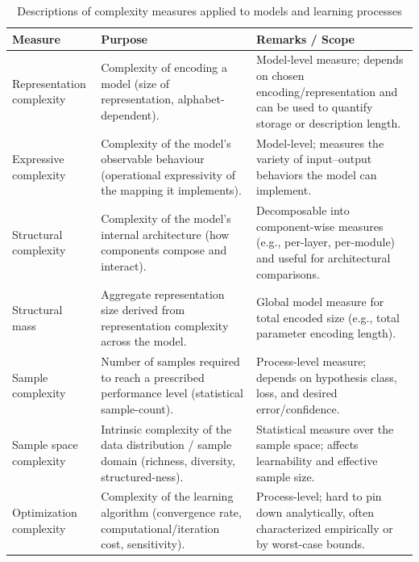 \documentclass[10pt]{article}
\begin{document}
\begin{table}[htbp]
  \centering
  \footnotesize
  \begin{threeparttable}
    \caption{Descriptions of complexity measures applied to models and learning processes}
    \label{tab:complexity-measures}
    \begin{tabularx}{\textwidth}{@{} >{\RaggedRight\arraybackslash}X
                                     >{\RaggedRight\arraybackslash}X
                                     >{\RaggedRight\arraybackslash}X @{}}
      \toprule
      \textbf{Measure} & \textbf{Purpose} & \textbf{Remarks / Scope} \\
      \midrule
      Representation complexity
        & Complexity of encoding a model (size of representation, alphabet-dependent).
        & Model-level measure; depends on chosen encoding/representation and can be used to quantify storage or description length. \\
      \addlinespace[2pt]
      Expressive complexity
        & Complexity of the model's observable behaviour (operational expressivity of the mapping it implements).
        & Model-level; measures the variety of input–output behaviors the model can implement. \\
      \addlinespace[2pt]
      Structural complexity
        & Complexity of the model's internal architecture (how components compose and interact).
        & Decomposable into component-wise measures (e.g., per-layer, per-module) and useful for architectural comparisons. \\
      \addlinespace[2pt]
      Structural mass
        & Aggregate representation size derived from representation complexity across the model.
        & Global model measure for total encoded size (e.g., total parameter encoding length). \\
      \addlinespace[2pt]
      Sample complexity
        & Number of samples required to reach a prescribed performance level (statistical sample-count).
        & Process-level measure; depends on hypothesis class, loss, and desired error/confidence. \\
      \addlinespace[2pt]
      Sample space complexity
        & Intrinsic complexity of the data distribution / sample domain (richness, diversity, structured-ness).
        & Statistical measure over the sample space; affects learnability and effective sample size. \\
      \addlinespace[2pt]
      Optimization complexity
        & Complexity of the learning algorithm (convergence rate, computational/iteration cost, sensitivity).
        & Process-level; hard to pin down analytically, often characterized empirically or by worst-case bounds. \\
      \bottomrule
    \end{tabularx}


\end{threeparttable}
\end{table}
\end{document}
